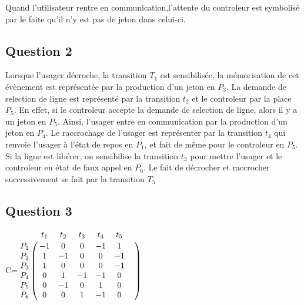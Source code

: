 Quand l'utilisateur rentre en communication,l'attente du controleur est symbolisé par le faite qu'il n'y est pas de jeton dans celui-ci.

\subsection{Question 2}

Lorsque l'usager décroche, la transition $T_1$ est sensibilisée, la mémorisation de cet évènement est représentée par la production d'un jeton en $P_3$.
La demande de selection de ligne est représenté par la transition $t_2$ et le controleur par la place $P_5$. En effet, si le controleur accepte la demande de selection de ligne, alors il y a un jeton en $P_5$.
Ainsi, l'usager entre en communication par la production d'un jeton en $P_4$.
Le raccrochage de l'usager est représenter par la transition $t_4$ qui renvoie l'usager à l'état de repos en $P_1$, et fait de même pour le controleur en $P_5$.
Si la ligne est libérer, on sensibilise la transition $t_3$ pour mettre l'usager et le controleur en état de faux appel en $P_6$.
Le fait de décrocher et raccrocher successivement se fait par la transition $T_5$


\subsection{Question 3}

\begin{center}

{\Huge C}\qquad =\qquad $\bordermatrix{
&t_1&t_2&t_3&t_4&t_5&\cr
P_1&-1&0&0&-1&1\cr
P_2&1&-1&0&0&-1\cr
P_3&1&0&0&0&-1\cr
P_4&0&1&-1&-1&0\cr
P_5&0&-1&0&1&0\cr
P_6&0&0&1&-1&0\cr
}$

\end{center}

